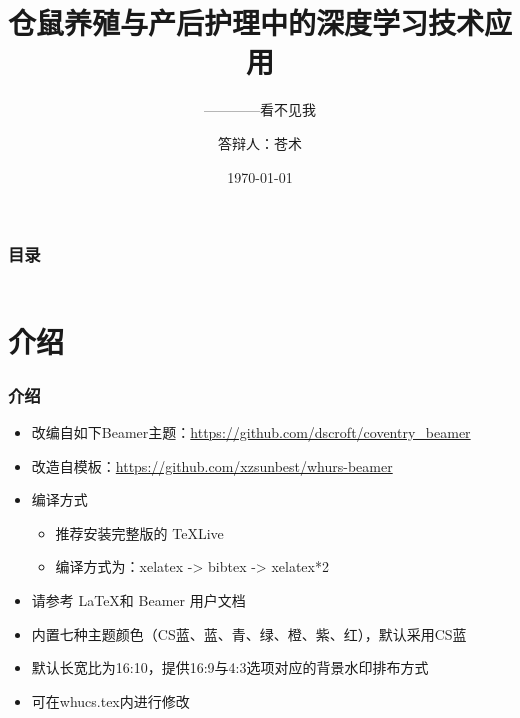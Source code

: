 \documentclass[presentation,aspectratio=1610]{beamer}
\title[计算机学院]{仓鼠养殖与产后护理中的深度学习技术应用} %
\subtitle{————看不见我}
\author{答辩人：苍术} %
\institute[WHU]{指导老师：大仓鼠}%
\date{\today} %
\begin{document}
\begin{frame}
\titlepage %
\end{frame}

\begin{frame}
\frametitle{目录} %
    \begin{columns}[T]
    	
		\begin{column}{.45\textwidth}
				\centering
				\tableofcontents[sections={1-3}]
		\end{column}
		\begin{column}{.45\textwidth}
				\centering
			\tableofcontents[sections={4-7}]
		\end{column}
	\end{columns}
\end{frame}


\section{介绍} %


\begin{frame}
\frametitle{介绍}
	\begin{itemize}
	\item 改编自如下Beamer主题：\url{https://github.com/dscroft/coventry_beamer}
	\item 改造自模板：\url{https://github.com/xzsunbest/whurs-beamer}
    \item {编译方式}
	    \begin{itemize}
	    	\item 推荐安装完整版的 TeXLive
	    	\item 编译方式为：xelatex -> bibtex -> xelatex*2
	    \end{itemize}
    \item 请参考 \LaTeX 和 Beamer 用户文档 
    \item 内置七种主题颜色（CS蓝、蓝、青、绿、橙、紫、红），默认采用CS蓝
    \item 默认长宽比为16:10，提供16:9与4:3选项对应的背景水印排布方式
    \item 可在whucs.tex内进行修改
  \end{itemize}
\end{frame}
\end{document}
